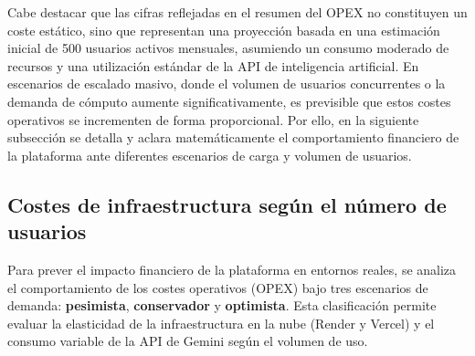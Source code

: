 Cabe destacar que las cifras reflejadas en el resumen del OPEX no constituyen un coste estático, sino que representan una proyección basada en una estimación inicial de 500 usuarios activos mensuales, asumiendo un consumo moderado de recursos y una utilización estándar de la API de inteligencia artificial. En escenarios de escalado masivo, donde el volumen de usuarios concurrentes o la demanda de cómputo aumente significativamente, es previsible que estos costes operativos se incrementen de forma proporcional. Por ello, en la siguiente subsección se detalla y aclara matemáticamente el comportamiento financiero de la plataforma ante diferentes escenarios de carga y volumen de usuarios.

\subsection{Costes de infraestructura según el número de usuarios}

Para prever el impacto financiero de la plataforma en entornos reales, se analiza el comportamiento de los costes operativos (OPEX) bajo tres escenarios de demanda: \textbf{pesimista}, \textbf{conservador} y \textbf{optimista}. Esta clasificación permite evaluar la elasticidad de la infraestructura en la nube (Render y Vercel) y el consumo variable de la API de Gemini según el volumen de uso.

\begin{table}[H]
\centering
\small
\renewcommand{\arraystretch}{1.2}
\caption{Comparativa de OPEX según escenario de escalado.}
\label{tab:escalado_opex}
\end{table}

